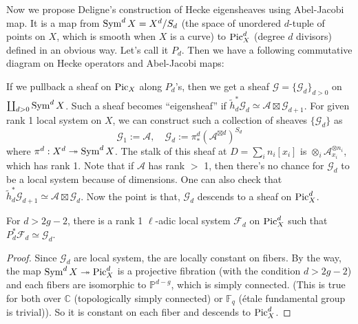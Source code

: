 Now we propose Deligne's construction of Hecke eigensheaves using Abel-Jacobi map.
It is a map from $\operatorname{\mathrm{Sym}}^{d}X = X^{d} / S_{d}$ (the space of unordered $d$-tuple of points on $X$, which is smooth when $X$ is a curve) to $\operatorname{\mathrm{Pic}}_{X}^{d}$ (degree $d$ divisors) defined in an obvious way.
Let's call it $P_{d}$.
Then we have a following commutative diagram on Hecke operators and Abel-Jacobi maps:
\begin{center}
\end{center}
If we pullback a sheaf on $\operatorname{\mathrm{Pic}}_X$ along $P_{d}$'s, then we get a sheaf $\mathcal{G} = \{\mathcal{G}_{d}\}_{d>0}$ on $\coprod_{d>0} \operatorname{\mathrm{Sym}}^{d}X$.
Such a sheaf becomes ``eigensheaf'' if $\tilde{h}_{d}^{*}\mathcal{G}_{d} \simeq \mathcal{A} \boxtimes \mathcal{G}_{d+1}$.
For given rank 1 local system on $X$, we can construct such a collection of sheaves $\{\mathcal{G}_{d}\}$ as
$$
\mathcal{G}_{1} := \mathcal{A}, \quad \mathcal{G}_{d}:= \pi^{d}_{*}(\mathcal{A}^{\boxtimes d})^{S_d}
$$
where $\pi^{d}: X^{d} \twoheadrightarrow \operatorname{\mathrm{Sym}}^{d}X$.
The stalk of this sheaf at $D = \sum_i n_i [x_i]$ is $\otimes_{i} \mathcal{A}_{x_i}^{\otimes n_i}$, which has rank 1.
Note that if $\mathcal{A}$ has rank $>$ 1, then there's no chance for $\mathcal{G}_{d}$ to be a local system because of dimensions.
One can also check that $\tilde{h}_{d}^{*}\mathcal{G}_{d+1} \simeq \mathcal{A} \boxtimes \mathcal{G}_{d}$.
Now the point is that, $\mathcal{G}_{d}$ descends to a sheaf on $\operatorname{\mathrm{Pic}}_X^{d}$.
\begin{theorem}
    For $d > 2g - 2$, there is a rank 1 $\ell$-adic local system $\mathcal{F}_{d}$ on $\operatorname{\mathrm{Pic}}_X^{d}$ such that $P_{d}^{*}\mathcal{F}_{d} \simeq \mathcal{G}_{d}$.
\end{theorem}
\begin{proof}
    Since $\mathcal{G}_{d}$ are local system, the are locally constant on fibers. By the way, the map $\operatorname{\mathrm{Sym}}^{d}X \twoheadrightarrow \operatorname{\mathrm{Pic}}^{d}_X$
    is a projective fibration (with the condition $d > 2g - 2$) and each fibers are isomorphic to $\mathbb{P}^{d-g}$, which is simply connected.
    (This is true for both over $\mathbb{C}$ (topologically simply connected) or $\mathbb{F}_{q}$ (\'etale fundamental group is trivial)).
    So it is constant on each fiber and descends to $\operatorname{\mathrm{Pic}}_X^{d}$.
\end{proof}
